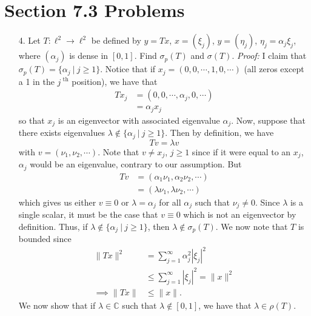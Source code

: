 \documentclass{article}
\begin{document}
\section*{Section 7.3 Problems}
\begin{itemize}
    \item[4.] Let $T: \ell^2 \to \ell^2$ be defined by $y = Tx$, $x = (\xi_j)$, $y = (\eta_j)$, $\eta_j = \alpha_j\xi_j$, where $(\alpha_j)$ is dense in $[0,1]$. Find $\sigma_p(T)$ and $\sigma(T)$.
    \newline\newline
    \textit{Proof:} I claim that $\sigma_p(T) = \{\alpha_j \: | \: j \geq 1\}$. Notice that if $x_j = (0,0,\cdots, 1, 0,\cdots )$ (all zeros except a 1 in the $j^{\text{ th}}$ position), we have that
    \begin{align*}
        Tx_j &= (0,0,\cdots, \alpha_j, 0, \cdots)\\
        &= \alpha_j x_j
    \end{align*}
    so that $x_j$ is an eigenvector with associated eigenvalue $\alpha_j$. Now, suppose that there exists eigenvalues $\lambda \notin \{\alpha_j \: | \: j \geq 1\}$. Then by definition, we have
    \[Tv = \lambda v\]
    with $v = (\nu_1, \nu_2,\cdots)$. Note that $v \neq x_j$, $j \geq 1$ since if it were equal to an $x_j$, $\alpha_j$ would be an eigenvalue, contrary to our assumption. But
    \begin{align*}
        Tv &= (\alpha_1\nu_1, \alpha_2\nu_2, \cdots)\\
        &= (\lambda\nu_1, \lambda\nu_2, \cdots)
    \end{align*}
    which gives us either $v \equiv 0$ or $\lambda = \alpha_j$ for all $\alpha_j$ such that $\nu_j \neq 0$. Since $\lambda$ is a single scalar, it must be the case that $v \equiv 0$ which is not an eigenvector by definition. Thus, if $\lambda \notin \{\alpha_j \: | \: j \geq 1\}$, then $\lambda \notin \sigma_p(T)$.
    \newline\newline
    We now note that $T$ is bounded since 
    \begin{align*}
        \|Tx\|^2 &= \sum_{j = 1}^{\infty} \alpha_j^2|\xi_j|^2\\
        &\leq \sum_{j = 1}^{\infty} |\xi_j|^2 = \|x\|^2\\
        \implies \|Tx\| &\leq \|x\|.
    \end{align*}
    We now show that if $\lambda \in \mathbb{C}$ such that $\lambda \notin [0,1]$, we have that $\lambda \in \rho(T)$. 

\end{itemize}
\end{document}
